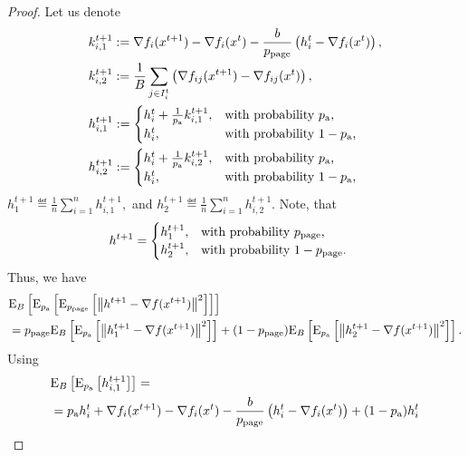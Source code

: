 \documentclass{article}
\begin{document}
\begin{proof}
  Let us denote
  \begin{align*}
      &k^{t+1}_{i, 1} := \nabla f_i(x^{t+1}) - \nabla f_i(x^{t}) - \frac{b}{p_{\text{page}}} \left(h^t_i - \nabla f_i(x^{t})\right), \\
      &k^{t+1}_{i, 2} := \frac{1}{B}\sum_{j \in I^t_i}\left(\nabla f_{ij}(x^{t+1}) - \nabla f_{ij}(x^{t})\right), \\
      &h^{t+1}_{i,1} := \begin{cases}
          h^t_i + \frac{1}{p_{\textnormal{a}}} k^{t+1}_{i, 1},& \textnormal{with probability $p_{\textnormal{a}}$,} \\
          h^t_i, & \textnormal{with probability $1 - p_{\textnormal{a}}$,} 
      \end{cases}  \\
      &h^{t+1}_{i,2} := \begin{cases}
          h^t_i + \frac{1}{p_{\textnormal{a}}} k^{t+1}_{i, 2},& \textnormal{with probability $p_{\textnormal{a}}$,} \\
          h^t_i, & \textnormal{with probability $1 - p_{\textnormal{a}}$,}
      \end{cases}  \\
  \end{align*}
  $h^{t+1}_{1} \eqdef \frac{1}{n}\sum_{i=1}^n h^{t+1}_{i,1},$ and $h^{t+1}_{2} \eqdef \frac{1}{n}\sum_{i=1}^n h^{t+1}_{i,2}.$ Note, that
  \begin{align*}
    &h^{t+1} = \begin{cases}
      h^{t+1}_{1},& \textnormal{with probability $p_{\text{page}}$,} \\
      h^{t+1}_{2},& \textnormal{with probability $1 - p_{\text{page}}$.} 
    \end{cases}
  \end{align*}
  Thus, we have
  \begin{align*}
    &{\rm E}_{B}\left[{\rm E}_{p_{\textnormal{a}}}\left[{\rm E}_{p_{\text{page}}}\left[\left\| h^{t+1} - \nabla f(x^{t+1}) \right\|^2\right]\right]\right] \\
    &=p_{\text{page}}{\rm E}_{B}\left[{\rm E}_{p_{\textnormal{a}}}\left[\left\| h^{t+1}_{1} - \nabla f(x^{t+1}) \right\|^2\right]\right] + (1 - p_{\text{page}}){\rm E}_{B}\left[{\rm E}_{p_{\textnormal{a}}}\left[\left\| h^{t+1}_{2} - \nabla f(x^{t+1}) \right\|^2\right]\right].\\
  \end{align*}
  Using 
  \begin{align*}
    &\ExpSub{B}{\ExpSub{\probavailable}{h^{t+1}_{i,1}}} = \\
    &=\probavailable h^t_i +  \nabla f_i(x^{t+1}) - \nabla f_i(x^{t}) - \frac{b}{\probpage} \left(h^t_i - \nabla f_i(x^{t})\right) + (1 - \probavailable) h^t_i \\

\end{align*}
\end{proof}
\end{document}
